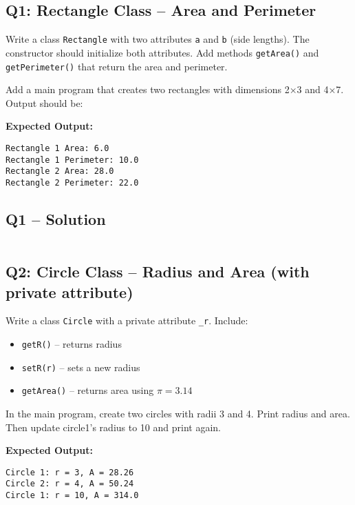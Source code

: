 \documentclass[a4paper,11pt]{article}
\begin{document}
\subsection*{Q1: Rectangle Class – Area and Perimeter}
Write a class \texttt{Rectangle} with two attributes \texttt{a} and \texttt{b} (side lengths). The constructor should initialize both attributes. Add methods \texttt{getArea()} and \texttt{getPerimeter()} that return the area and perimeter.

Add a main program that creates two rectangles with dimensions 2×3 and 4×7. Output should be:

\textbf{Expected Output:}
\begin{flushleft}
	\texttt{Rectangle 1 Area: 6.0}\\
	\texttt{Rectangle 1 Perimeter: 10.0}\\
	\texttt{Rectangle 2 Area: 28.0}\\
	\texttt{Rectangle 2 Perimeter: 22.0}
\end{flushleft}

\subsection*{Q1 – Solution}
\inputminted{python}{Files/10/1.py}

\subsection*{Q2: Circle Class – Radius and Area (with private attribute)}
Write a class \texttt{Circle} with a private attribute \texttt{\_r}. Include:

\begin{itemize}
	\item \texttt{getR()} – returns radius
	\item \texttt{setR(r)} – sets a new radius
	\item \texttt{getArea()} – returns area using $\pi = 3.14$
\end{itemize}

In the main program, create two circles with radii 3 and 4. Print radius and area. Then update circle1’s radius to 10 and print again.

\textbf{Expected Output:}
\begin{flushleft}
	\texttt{Circle 1: r = 3, A = 28.26}\\
	\texttt{Circle 2: r = 4, A = 50.24}\\
	\texttt{Circle 1: r = 10, A = 314.0}
\end{flushleft}
\end{document}
